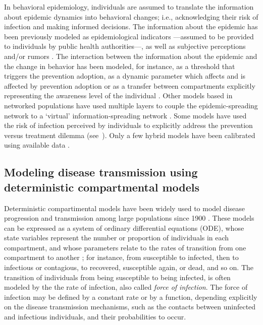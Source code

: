 In behavioral epidemiology, individuals are assumed to translate the information about epidemic dynamics into behavioral changes; i.e., acknowledging their risk of infection and making informed decisions. The information about the epidemic has been previously modeled as epidemiological indicators ---assumed to be provided to individuals by public health authorities---, as well as subjective perceptions and/or rumors \cite[]{Verelst2016}. The interaction between the information about the epidemic and the change in behavior has been modeled, for instance, as a threshold that triggers the prevention adoption, as a dynamic parameter which affects and is affected by prevention adoption or as a transfer between compartments explicitly representing the awareness level of the individual \cite[]{Verelst2016}. Other models based in networked populations have used multiple layers to couple the epidemic-spreading network to a `virtual' information-spreading network \cite[]{Wang2016}. Some models have used the risk of infection perceived by individuals to explicitly address the prevention versus treatment dilemma (see~). Only a few hybrid models have been calibrated using available data \cite[]{Verelst2016}.

							
\subsection{Modeling disease transmission using deterministic compartmental models}

Deterministic compartimental models have been widely used to model disease progression and transmission among large populations since 1900 \cite[]{Brauer2017}. These models can be expressed as a system of ordinary differential equations (ODE), whose state variables represent the number or proportion of individuals in each compartment, and whose parameters relate to the rates of transition from one compartment to another \cite[]{Hethcote2000}; for instance, from susceptible to infected, then to infectious or contagious, to recovered, susceptible again, or dead, and so on. The transition of individuals from being susceptible to being infected, is often modeled by the the rate of infection, also called \textit{force of infection}. The force of infection may be defined by a constant rate or by a function, depending explicitly on the disease transmission mechanisms, such as the contacts between uninfected and infectious individuals, and their probabilities to occur. 

